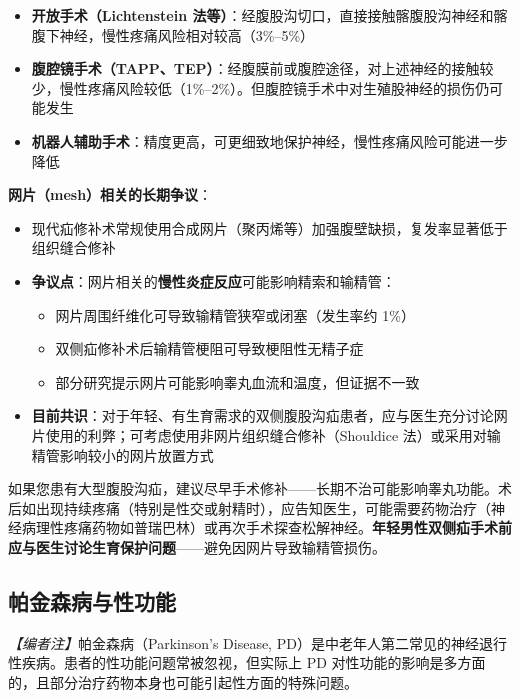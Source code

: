 \documentclass[12pt,a4paper,twoside]{ctexbook}
\begin{document}
\begin{itemize}[leftmargin=2cm]
	\item \textbf{开放手术（Lichtenstein 法等）}：经腹股沟切口，直接接触髂腹股沟神经和髂腹下神经，慢性疼痛风险相对较高（3\%--5\%）
	\item \textbf{腹腔镜手术（TAPP、TEP）}：经腹膜前或腹腔途径，对上述神经的接触较少，慢性疼痛风险较低（1\%--2\%）。但腹腔镜手术中对生殖股神经的损伤仍可能发生
	\item \textbf{机器人辅助手术}：精度更高，可更细致地保护神经，慢性疼痛风险可能进一步降低
\end{itemize}

\vspace{0.5em}
\noindent\textbf{网片（mesh）相关的长期争议}：

\begin{itemize}[leftmargin=2cm]
	\item 现代疝修补术常规使用合成网片（聚丙烯等）加强腹壁缺损，复发率显著低于组织缝合修补
	\item \textbf{争议点}：网片相关的\textbf{慢性炎症反应}可能影响精索和输精管：
	\begin{itemize}
		\item 网片周围纤维化可导致输精管狭窄或闭塞（发生率约 1\%）
		\item 双侧疝修补术后输精管梗阻可导致梗阻性无精子症
		\item 部分研究提示网片可能影响睾丸血流和温度，但证据不一致
	\end{itemize}
	\item \textbf{目前共识}：对于年轻、有生育需求的双侧腹股沟疝患者，应与医生充分讨论网片使用的利弊；可考虑使用非网片组织缝合修补（Shouldice 法）或采用对输精管影响较小的网片放置方式
\end{itemize}

\begin{tcolorbox}[colback=pink!5!white,colframe=red!50!black,title=贴心小叮咛]
如果您患有大型腹股沟疝，建议尽早手术修补——长期不治可能影响睾丸功能。术后如出现持续疼痛（特别是性交或射精时），应告知医生，可能需要药物治疗（神经病理性疼痛药物如普瑞巴林）或再次手术探查松解神经。\textbf{年轻男性双侧疝手术前应与医生讨论生育保护问题}——避免因网片导致输精管损伤。
\end{tcolorbox}

\subsection{帕金森病与性功能}
\label{subsec:parkinson_sex}

\noindent\textit{【编者注】}帕金森病（Parkinson's Disease, PD）是中老年人第二常见的神经退行性疾病。患者的性功能问题常被忽视，但实际上 PD 对性功能的影响是多方面的，且部分治疗药物本身也可能引起性方面的特殊问题。
\end{document}
